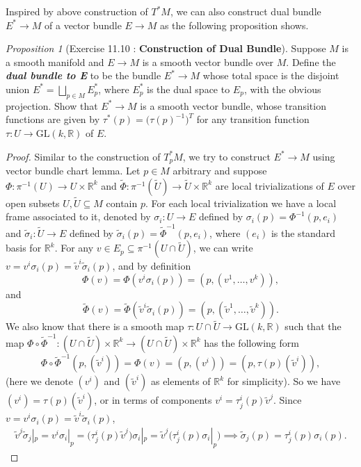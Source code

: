 \documentclass[a4paper]{article}
\theoremstyle{remark}
\newtheorem{prop}{Proposition}
\newcommand{\er}{\mathbb{R}} %
\newcommand{\rk}{\mathbb{R}^k} %
\newcommand{\subhim}{\subseteq} %
\newcommand{\GLkr}{\text{GL}(k,\er)} %
\newcommand{\GLsaja}{\text{GL}} %
\newcommand{\tpstarm}{T^*_pM} %
\newcommand\wtilde[1]{\widetilde{#1}} %
\begin{document}
Inspired by above construction of $T^*M$, we can also construct dual bundle $E^* \to M$ of a vector bundle $E \to M$ as the following proposition shows.

\begin{prop}[Exercise 11.10 : \textbf{Construction of Dual Bundle}]
Suppose $M$ is a smooth manifold and $E \to M$ is a smooth vector bundle over $M$. Define the \textit{\textbf{dual bundle to E}} to be the bundle $E^* \to M$ whose total space is the disjoint union $E^* = \bigsqcup_{p \in M} E^*_p$, where $E^*_p$ is the dual space to $E_p$, with the obvious projection. Show that $E^* \to M$ is a smooth vector bundle, whose transition functions are given by $\tau^*(p) = \big(\tau(p)^{-1} \big)^T$ for any transition function $\tau : U \to \GLsaja(k,\er)$ of $E$.   
\end{prop}
\begin{proof}
Similar to the construction of $\tpstarm$, we try to construct $E^* \to M$ using vector bundle chart lemma. Let $p \in M$ arbitrary and suppose $\Phi : \pi^{-1}(U) \to U \times \rk$ and $\wtilde{\Phi} : \pi^{-1}(\wtilde{U}) \to \wtilde{U} \times \rk$ are local trivializations of $E$ over open subsets $U, \wtilde{U} \subhim M$ contain $p$. For each local trivialization we have a local frame associated to it, denoted by $\sigma_i : U \to E$ defined by $\sigma_i(p) = \Phi^{-1} (p,e_i)$ and $\wtilde{\sigma}_i : \wtilde{U} \to E$ defined by $\wtilde{\sigma}_i(p) = \wtilde{\Phi}^{-1}(p,e_i)$, where $(e_i)$ is the standard basis for $\rk$. For any $v \in E_p \subhim \pi^{-1}(U \cap \wtilde{U})$, we can write $v = v^i \sigma_i(p) = \wtilde{v}^i \wtilde{\sigma}_i(p)$, and by definition 
$$
\Phi (v) = \Phi (v^i \sigma_i(p)) = (p, (v^1,\dots,v^k)),
$$
and
$$
\wtilde{\Phi} (v) = \wtilde{\Phi} (\wtilde{v}^i \wtilde{\sigma}_i(p)) = (p, (\wtilde{v}^1,\dots,\wtilde{v}^k )).
$$
We also know that there is a smooth map $\tau : U \cap \wtilde{U} \to \GLkr$ such that the map $\Phi \circ \wtilde{\Phi}^{-1} : (U \cap \wtilde{U}) \times \rk \to (U \cap \wtilde{U}) \times \rk$ has the following form
$$
\Phi \circ \wtilde{\Phi}^{-1} (p, (\wtilde{v}^i) ) = \Phi(v) = (p, (v^i)) = (p, \tau(p) (\wtilde{v}^i) ), 
$$
(here we denote $(v^i)$ and $(\wtilde{v}^i)$ as elements of $\rk$ for simplicity). So we have $(v^i) = \tau(p) (\wtilde{v}^i)$, or in terms of components $v^i = \tau^i_j(p) \wtilde{v}^j$. Since $v = v^i \sigma_i(p) = \wtilde{v}^i \wtilde{\sigma}_i(p)$, 
\begin{align*}
\wtilde{v}^j \wtilde{\sigma}_j|_p =  v^i \sigma_i|_p = \big(\tau^i_j(p) \wtilde{v}^j \big) \sigma_i|_p = \wtilde{v}^j \Big(\tau^i_j(p) \sigma_i|_p \Big) \implies \wtilde{\sigma}_j(p) = \tau^i_j (p) \sigma_i(p).
\end{align*}


\end{proof}
\end{document}
